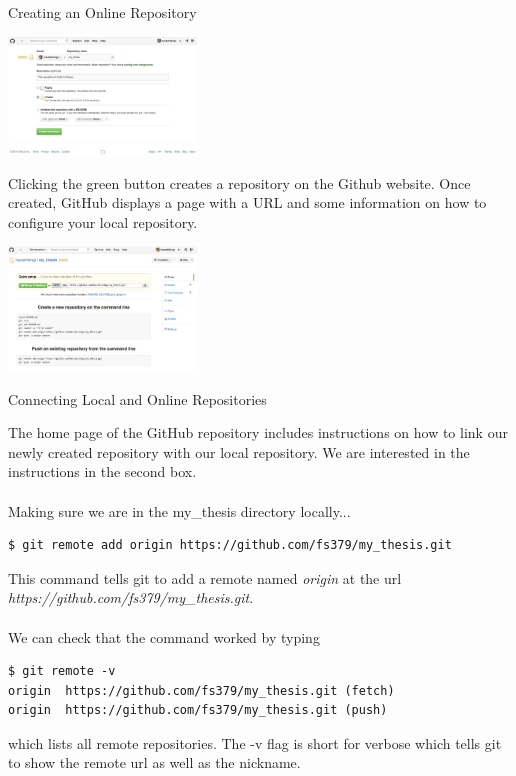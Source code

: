 \documentclass[10pt]{beamer}
\begin{document}
\begin{frame}[fragile]{Creating an Online Repository}

\begin{center}
\includegraphics[width=5cm]{./auxfiles/Ghub1.jpg}
\end{center}
Clicking the green button creates a repository on the Github website. Once created, GitHub displays a page with a URL and some information on how to configure your local repository. 
\begin{center}
\includegraphics[width=5cm]{./auxfiles/Ghub2.jpg}
\end{center}
\end{frame}

\begin{frame}[fragile]{Connecting Local and Online Repositories}

The home page of the GitHub repository includes instructions on how to link our newly created repository with our local repository.  We are interested in the instructions in the second box.\\~\\

Making sure we are in the my\_thesis directory locally...
\begin{lstlisting}
$ git remote add origin https://github.com/fs379/my_thesis.git
\end{lstlisting}
This command tells git to add a remote named \emph{origin} at the url \emph{https://github.com/fs379/my\_thesis.git}.\\~\\

We can check that the command worked by typing
\begin{lstlisting}[frame=single]
$ git remote -v
origin	https://github.com/fs379/my_thesis.git (fetch)
origin	https://github.com/fs379/my_thesis.git (push)
\end{lstlisting}
which lists all remote repositories. The -v flag is short for verbose which tells git to show the remote url as well as the nickname.\\

\end{frame}
\end{document}

